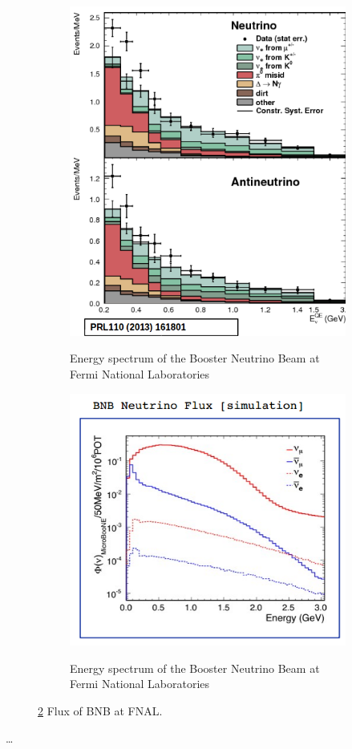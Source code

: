 \begin{figure}[htp!]
\centering
	\begin{subfigure}[b]{.4\textwidth}
	\includegraphics[width=\textwidth]{figs/lee.png}
	\label{fig:lee}
	\caption{Energy spectrum of the Booster Neutrino Beam at Fermi National Laboratories}
	\end{subfigure}
	\quad
	\begin{subfigure}[b]{.4\textwidth}
	\includegraphics[width=\textwidth]{figs/bnbflux.png}
	\label{fig:bnbflux}
	\caption{Energy spectrum of the Booster Neutrino Beam at Fermi National Laboratories}
	\end{subfigure}
	\quad
\label{fig:figures}
\caption{\ref{fig:bnbflux} Flux of BNB at FNAL.}
\end{figure}
\clearpage
\dots
